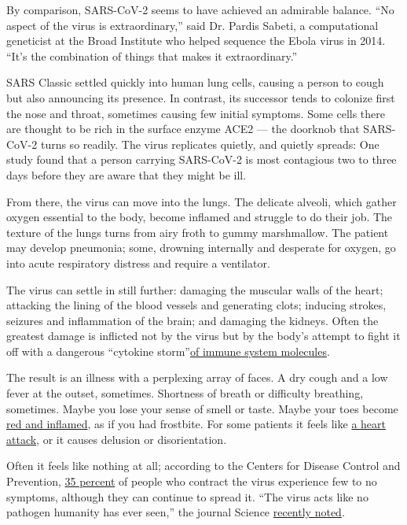 By comparison, SARS-CoV-2 seems to have achieved an admirable balance.
``No aspect of the virus is extraordinary,'' said Dr. Pardis Sabeti, a
computational geneticist at the Broad Institute who helped sequence the
Ebola virus in 2014. ``It's the combination of things that makes it
extraordinary.''

SARS Classic settled quickly into human lung cells, causing a person to
cough but also announcing its presence. In contrast, its successor tends
to colonize first the nose and throat, sometimes causing few initial
symptoms. Some cells there are thought to be rich in the surface enzyme
ACE2 --- the doorknob that SARS-CoV-2 turns so readily. The virus
replicates quietly, and quietly spreads: One study found that a person
carrying SARS-CoV-2 is most contagious two to three days before they are
aware that they might be ill.

From there, the virus can move into the lungs. The delicate alveoli,
which gather oxygen essential to the body, become inflamed and struggle
to do their job. The texture of the lungs turns from airy froth to gummy
marshmallow. The patient may develop pneumonia; some, drowning
internally and desperate for oxygen, go into acute respiratory distress
and require a ventilator.

The virus can settle in still further: damaging the muscular walls of
the heart; attacking the lining of the blood vessels and generating
clots; inducing strokes, seizures and inflammation of the brain; and
damaging the kidneys. Often the greatest damage is inflicted not by the
virus but by the body's attempt to fight it off with a dangerous
``cytokine
storm''\href{https://www.nytimes.com/2020/04/01/health/coronavirus-cytokine-storm-immune-system.html}{of
immune system molecules}.

The result is an illness with a perplexing array of faces. A dry cough
and a low fever at the outset, sometimes. Shortness of breath or
difficulty breathing, sometimes. Maybe you lose your sense of smell or
taste. Maybe your toes become
\href{https://www.nytimes.com/2020/05/01/health/coronavirus-covid-toe.html}{red
and inflamed}, as if you had frostbite. For some patients it feels like
\href{https://www.sfgate.com/bayarea/article/Coronavirus-updates-COVID-19-Bay-Area-deaths-cases-15225947.phphttps://www.sfgate.com/bayarea/article/Coronavirus-updates-COVID-19-Bay-Area-deaths-cases-15225947.php}{a
heart attack}, or it causes delusion or disorientation.

Often it feels like nothing at all; according to the Centers for Disease
Control and Prevention,
\href{https://www.nytimes.com/2020/03/31/health/coronavirus-asymptomatic-transmission.htmlhttps://www.nytimes.com/2020/03/31/health/coronavirus-asymptomatic-transmission.html}{35
percent} of people who contract the virus experience few to no symptoms,
although they can continue to spread it. ``The virus acts like no
pathogen humanity has ever seen,'' the journal Science
\href{https://www.sciencemag.org/news/2020/04/how-does-coronavirus-kill-clinicians-trace-ferocious-rampage-through-body-brain-toes}{recently
noted}.


